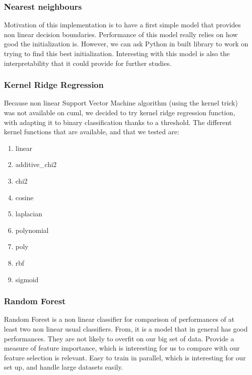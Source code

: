 \documentclass{article}
\begin{document}
    \subsubsection{Nearest neighbours}

    Motivation of this implementation is to have a first simple model that provides non linear decision boundaries.
    Performance of this model really relies on how good the initialization is.
    However, we can ask Python in built library to work on trying to find this best initialization.
    Interesting with this model is also the interpretability that it could provide for further studies.

    \subsubsection{Kernel Ridge Regression}
    Because non linear Support Vector Machine algorithm (using the kernel trick) was not available on cuml, we decided to try kernel ridge regression function, with adapting it to binary classification thanks to a threshold.
    The different kernel functions that are available, and that we tested are:
    \begin{enumerate}
        \item linear
        \item additive\_chi2
        \item chi2
        \item cosine
        \item laplacian
        \item polynomial
        \item poly
        \item rbf
        \item sigmoid
    \end{enumerate}

    \subsubsection{Random Forest}
    Random Forest is a non linear classifier for comparison of performances of at least two non linear usual classifiers.
    From\cite{MLmodelsComparison}, it is a model that in general has good performances.
    They are not likely to overfit on our big set of data.
    Provide a measure of feature importance, which is interesting for us to compare with our feature selection is relevant.
    Easy to train in parallel, which is interesting for our set up, and handle large datasets easily.
\end{document}
